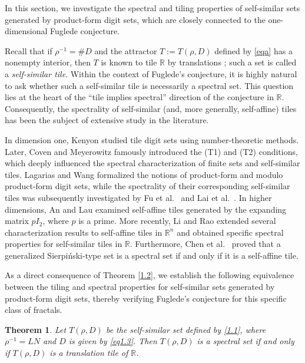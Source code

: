 \documentclass[11pt]{article}
\newtheorem{theorem}{Theorem}[section]
\numberwithin{equation}{section}
\begin{document}
In this section, we investigate the spectral and tiling properties of self-similar sets generated by product-form digit sets, which are closely connected to the one-dimensional Fuglede conjecture. 

Recall that if $\rho^{-1}=\#D$ and the attractor $T:=T(\rho,D)$ defined by \eqref{eqa} has a nonempty interior, then $T$ is known to tile $\mathbb{R}$ by translations \cite{LW_1996}; such a set is called a \emph{self-similar tile}. Within the context of Fuglede's conjecture, it is highly natural to ask whether such a self-similar tile is necessarily a spectral set. This question lies at the heart of the ``tile implies spectral'' direction of the conjecture in $\mathbb{R}$. Consequently, the spectrality of self-similar (and, more generally, self-affine) tiles has been the subject of extensive study in the literature.

In dimension one, Kenyon \cite{Ken1992} studied tile digit sets using number-theoretic methods. Later, Coven and Meyerowitz \cite{CM} famously introduced the (T1) and (T2) conditions, which deeply influenced the spectral characterization of finite sets and self-similar tiles. Lagarias and Wang \cite{LW_1996,LW_1996_2} formalized the notions of product-form and modulo product-form digit sets, while the spectrality of their corresponding self-similar tiles was subsequently investigated by Fu et al.~\cite{Fu-He-Lau2015} and Lai et al.~\cite{Lai2017}.
In higher dimensions, An and Lau \cite{An2019} examined self-affine tiles generated by the expanding matrix $pI_{2}$, where $p$ is a prime. More recently, Li and Rao \cite{LR_2025} extended several characterization results to self-affine tiles in $\mathbb{R}^{n}$ and obtained specific spectral properties for self-similar tiles in $\mathbb{R}$. Furthermore, Chen et al.~\cite{Chen-Liu-Zheng2024} proved that a generalized Sierpi\'{n}ski-type set is a spectral set if and only if it is a self-affine tile.

As a direct consequence of Theorem \ref{1.2}, we establish the following equivalence between the tiling and spectral properties for self-similar sets generated by product-form digit sets, thereby verifying Fuglede's conjecture for this specific class of fractals.

\begin{theorem}\label{1.3}
	Let $T(\rho,D)$ be the self-similar set defined by \eqref{1.1}, where $\rho^{-1}=LN$ and $D$ is given by \eqref{eq1.3}.
	Then $T(\rho,D)$ is a spectral set if and only if $T(\rho,D)$ is a translation tile of $\mathbb{R}$.
\end{theorem}
\end{document}
